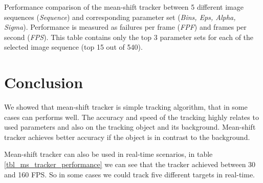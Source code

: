 \documentclass[runningheads]{llncs}
\begin{document}
\begin{table}
\centering
{}
\caption{Performance comparison of the mean-shift tracker between 5 different image sequences (\textit{Sequence}) and corresponding parameter set (\textit{Bins, Eps, Alpha, Sigma}). Performance is measured as failures per frame (\textit{FPF}) and frames per second (\textit{FPS}). This table contains only the top 3 parameter sets for each of the selected image sequence (top 15 out of 540).}
\label{tbl_ms_tracker_performance}
\end{table}

\section{Conclusion}
We showed that mean-shift tracker is simple tracking algorithm, that in some cases can performs well. The accuracy and speed of the tracking highly relates to used parameters and also on the tracking object and its background. Mean-shift tracker achieves better accuracy if the object is in contrast to the background.

Mean-shift tracker can also be used in real-time scenarios, in table \ref{tbl_ms_tracker_performance} we can see that the tracker achieved between 30 and 160 FPS. So in some cases we could track five different targets in real-time.
\end{document}
